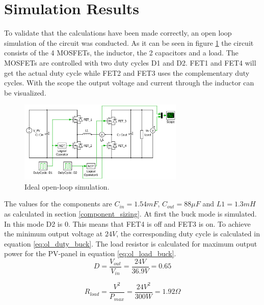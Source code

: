 \section{Simulation Results} \label{opsimresult}

To validate that the calculations have been made correctly, an open loop simulation of the circuit was conducted. As it can be seen in figure \ref{fig:openloop_schematic} the circuit consists of the 4 MOSFETs, the inductor, the 2 capacitors and a load. The MOSFETs are controlled with two duty cycles D1 and D2. FET1 and FET4 will get the actual duty cycle while FET2 and FET3 uses the complementary duty cycles. With the scope the output voltage and current through the inductor can be visualized.

\begin{figure}[H]
	\begin{center}
		\includegraphics[width=0.7\textwidth]{../Pictures/P1/Open_loop_simulation/open_loop_schematic}
		\caption{Ideal open-loop simulation.}
		\label{fig:openloop_schematic}
	\end{center}
\end{figure}

The values for the components are $C_{in}=1.54mF$, $C_{out}=88 \mu F$ and $L1=1.3mH$ as calculated in section \ref{component_sizing}. At first the buck mode is simulated. In this mode D2 is 0. This means that FET4 is off and FET3 is on. To achieve the minimum output voltage at $24V$, the corresponding duty cycle is calculated in equation \ref{eq:ol_duty_buck}. The load resistor is calculated for maximum output power for the PV-panel in equation \ref{eq:ol_load_buck}.
\begin{equation} \label{eq:ol_duty_buck}
	D= \frac{V_{out}}{V_{in}} = \frac{24V}{36.9V} = 0.65
\end{equation}

\begin{equation} \label{eq:ol_load_buck}
	R_{load} = \frac{V^2}{P_{max}} = \frac{24V^2}{300W} = 1.92 \Omega
\end{equation}

